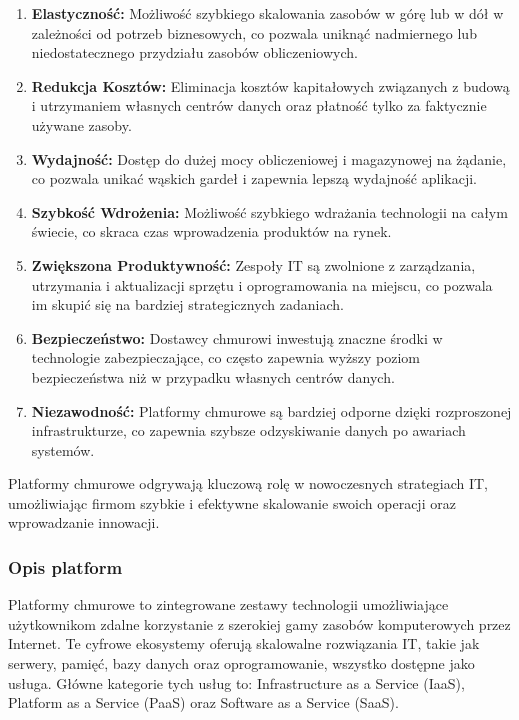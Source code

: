 \begin{enumerate}
    \item {\bf Elastyczność:}  Możliwość szybkiego skalowania zasobów w górę lub w dół w zależności od potrzeb biznesowych, co pozwala uniknąć nadmiernego lub niedostatecznego przydziału zasobów obliczeniowych.
    \item {\bf Redukcja Kosztów:}  Eliminacja kosztów kapitałowych związanych z budową i utrzymaniem własnych centrów danych oraz płatność tylko za faktycznie używane zasoby.
    \item {\bf Wydajność:} Dostęp do dużej mocy obliczeniowej i magazynowej na żądanie, co pozwala unikać wąskich gardeł i zapewnia lepszą wydajność aplikacji.
    \item {\bf Szybkość Wdrożenia:} Możliwość szybkiego wdrażania technologii na całym świecie, co skraca czas wprowadzenia produktów na rynek.
    \item {\bf Zwiększona Produktywność:} Zespoły IT są zwolnione z zarządzania, utrzymania i aktualizacji sprzętu i oprogramowania na miejscu, co pozwala im skupić się na bardziej strategicznych zadaniach.
    \item {\bf Bezpieczeństwo:} Dostawcy chmurowi inwestują znaczne środki w technologie zabezpieczające, co często zapewnia wyższy poziom bezpieczeństwa niż w przypadku własnych centrów danych.
    \item {\bf Niezawodność:} Platformy chmurowe są bardziej odporne dzięki rozproszonej infrastrukturze, co zapewnia szybsze odzyskiwanie danych po awariach systemów.
    
\end{enumerate}
Platformy chmurowe odgrywają kluczową rolę w nowoczesnych strategiach IT, umożliwiając firmom szybkie i efektywne skalowanie swoich operacji oraz wprowadzanie innowacji.

\subsubsection{Opis platform}
Platformy chmurowe to zintegrowane zestawy technologii umożliwiające użytkownikom zdalne korzystanie z szerokiej gamy zasobów komputerowych przez Internet. Te cyfrowe ekosystemy oferują skalowalne rozwiązania IT, takie jak serwery, pamięć, bazy danych oraz oprogramowanie, wszystko dostępne jako usługa. Główne kategorie tych usług to: Infrastructure as a Service (IaaS), Platform as a Service (PaaS) oraz Software as a Service (SaaS).


